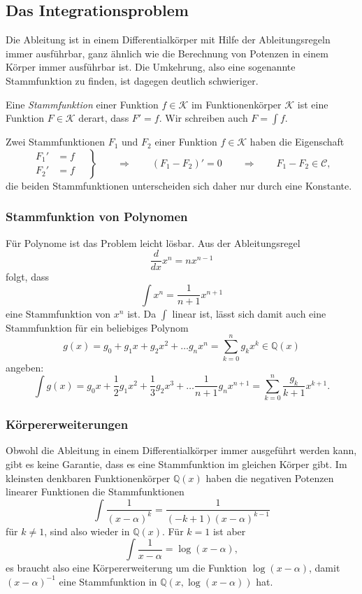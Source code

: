 %
%
%
\subsection{Das Integrationsproblem
\label{buch:integral:subsection:integrationsproblem}}
%
Die Ableitung ist in einem Differentialkörper mit Hilfe der Ableitungsregeln
immer ausführbar, ganz ähnlich wie die Berechnung von Potenzen in einem Körper
immer ausführbar ist.
Die Umkehrung, also eine sogenannte Stammfunktion zu finden, ist dagegen
deutlich schwieriger.

\begin{definition}
Eine {\em Stammfunktion} einer Funktion $f\in\mathscr{K}$ im Funktionenkörper
$\mathscr{K}$ ist eine Funktion $F\in\mathscr{K}$ derart, dass $F'=f$.
Wir schreiben auch $F=\int f$.
\end{definition}

Zwei Stammfunktionen $F_1$ und $F_2$ einer Funktion $f\in\mathscr{K}$
haben die Eigenschaft
\[
\left.\begin{aligned}
F_1' &= f \\
F_2' &= f 
\end{aligned}\quad\right\}
\qquad
\Rightarrow
\qquad
(F_1-F_2)' = 0
\qquad\Rightarrow\qquad
F_1-F_2\in\mathscr{C},
\]
die beiden Stammfunktionen unterscheiden sich daher nur durch eine
Konstante.

\subsubsection{Stammfunktion von Polynomen}
Für Polynome ist das Problem leicht lösbar.
Aus der Ableitungsregel
\[
\frac{d}{dx} x^n = nx^{n-1}
\]
folgt, dass
\[
\int x^n = \frac{1}{n+1} x^{n+1}
\]
eine Stammfunktion von $x^n$ ist.
Da $\int$ linear ist, lässt sich damit auch eine Stammfunktion für
ein beliebiges Polynom
\[
g(x)
=
g_0 + g_1x + g_2x^2 + \dots g_nx^n
=
\sum_{k=0}^n g_kx^k
\in\mathbb{Q}(x)
\]
angeben:
\begin{equation}
\int g(x)
=
g_0x + \frac12g_1x^2 + \frac13g_2x^3 + \dots \frac{1}{n+1}g_nx^{n+1}
=
\sum_{k=0}^n 
\frac{g_k}{k+1}x^{k+1}.
\label{buch:integral:iproblem:eqn:polyintegral}
\end{equation}

\subsubsection{Körpererweiterungen}
Obwohl die Ableitung in einem Differentialkörper immer ausgeführt werden 
kann, gibt es keine Garantie, dass es eine Stammfunktion im gleichen 
Körper gibt.
Im kleinsten denkbaren Funktionenkörper $\mathbb{Q}(x)$
haben die negativen Potenzen linearer Funktionen die Stammfunktionen
\[
\int
\frac{1}{(x-\alpha)^k}
=
\frac{1}{(-k+1)(x-\alpha)^{k-1}}
\]
für $k\ne 1$, sind also wieder in $\mathbb{Q}(x)$.
Für $k=1$ ist aber
\[
\int \frac{1}{x-\alpha}
=
\log(x-\alpha),
\]
es braucht also eine Körpererweiterung um die Funktion $\log(x-\alpha)$, damit
$(x-\alpha)^{-1}$ eine Stammfunktion in $\mathbb{Q}(x,\log(x-\alpha))$
hat.

